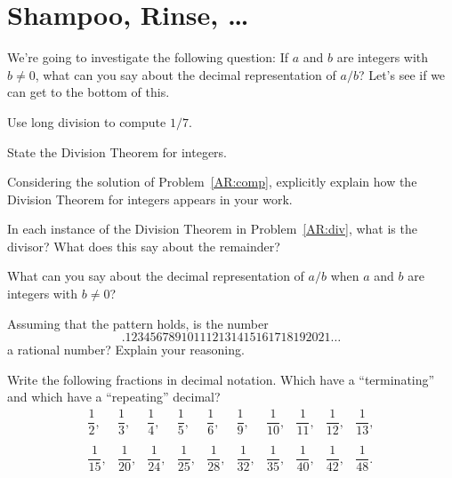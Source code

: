 \newpage
\section{Shampoo, Rinse, \dots}\label{A:Shampoo}

We're going to investigate the following question: If $a$ and $b$ are
integers with $b \ne 0$, what can you say about the decimal
representation of $a/b$? Let's see if we can get to the bottom of
this.

\begin{prob}\label{AR:comp} Use long division to compute $1/7$.
\end{prob}

\begin{prob}
State the Division Theorem for integers.
\end{prob}

\begin{prob}\label{AR:div}
Considering the solution of Problem~\ref{AR:comp}, explicitly
explain how the Division Theorem for integers appears in your work.
\end{prob}


\begin{prob} 
In each instance of the Division Theorem in Problem~\ref{AR:div}, what
is the divisor? What does this say about the remainder?
\end{prob}

\begin{prob} 
What can you say about the decimal representation of $a/b$ when $a$
and $b$ are integers with $b\ne 0$?
\end{prob}

\begin{prob} 
Assuming that the pattern holds, is the number
\[
.123456789101112131415161718192021\dots
\]
a rational number? Explain your reasoning.
\end{prob}




\begin{prob}\label{AR:exp}
Write the following fractions in decimal notation. Which have a
``terminating'' and which have a ``repeating'' decimal?
\[
\begin{array}{cccccccccc}
 \dfrac{1}{2}, &  \dfrac{1}{3}, &  \dfrac{1}{4}, &  \dfrac{1}{5}, &  \dfrac{1}{6}, & \dfrac{1}{9}, &  \dfrac{1}{10}, &  \dfrac{1}{11}, &  \dfrac{1}{12}, &  \dfrac{1}{13},  \\ \\
 \dfrac{1}{15}, & \dfrac{1}{20}, &  \dfrac{1}{24}, &  \dfrac{1}{25}, &  \dfrac{1}{28}, &  \dfrac{1}{32}, &  \dfrac{1}{35}, &  \dfrac{1}{40}, &  \dfrac{1}{42}, &  \dfrac{1}{48}.
\end{array}
\]
\end{prob}

